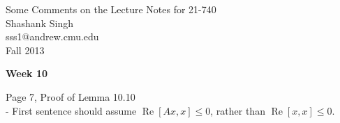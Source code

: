 \documentclass[11pt]{article}
\makeatletter
\newcommand{\myname}{Shashank Singh}
\newcommand{\myandrew}{sss1@andrew.cmu.edu}
\newcommand{\mydate}{Fall 2013}
\renewcommand{\Re}{\operatorname{Re}}       %
\makeatother
\begin{document}
\thispagestyle{plain}

\begin{center}
{\Large Some Comments on the Lecture Notes for 21-740} \\
\myname \\
\myandrew \\
\mydate
\end{center}

{\bf Week 10}

Page 7, Proof of Lemma 10.10   \\
    - First sentence should assume $\Re [Ax,x] \leq 0$, rather than
      $\Re [x,x] \leq 0$.    \\
\end{document}
